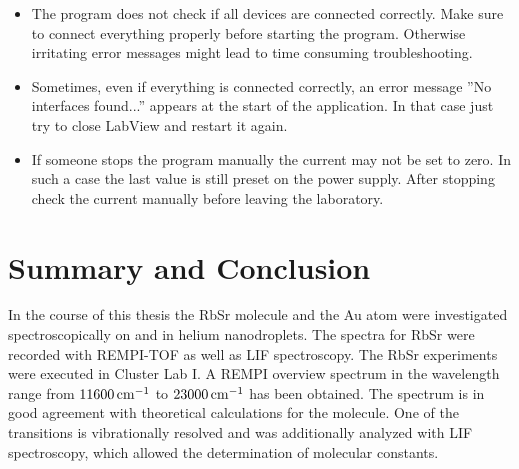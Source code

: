 \documentclass[parskip,12pt,headsepline,a4paper] {scrbook}
\begin{document}
\begin{itemize}
\item The program does not check if all devices are connected correctly. Make sure to connect everything properly before starting the program. Otherwise irritating error messages might lead to time consuming troubleshooting.
\item Sometimes, even if everything is connected correctly, an error message ''No interfaces found...'' appears at the start of the application. In that case just try to close LabView and restart it again.
\item If someone stops the program manually the current may not be set to zero. In such a case the last value is still preset on the power supply. After stopping check the current manually before leaving the laboratory.
\end{itemize}

\chapter{Summary and Conclusion}
In the course of this thesis the RbSr molecule and the Au atom were investigated spectroscopically on and in helium nanodroplets. The spectra for RbSr were recorded with REMPI-TOF as well as LIF spectroscopy. The RbSr experiments were executed in Cluster Lab I. A REMPI overview spectrum in the wavelength range from $\unit[11600]{cm^{-1}}$ to $\unit[23000]{cm^{-1}}$ has been obtained. The spectrum is in good agreement with theoretical calculations for the molecule. One of the transitions is vibrationally resolved and was additionally analyzed with LIF spectroscopy, which allowed the determination of molecular constants.
\end{document}
